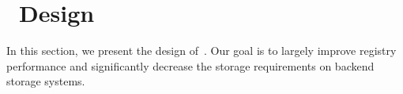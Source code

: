 \section{\sysname~Design}
\label{sec:slimmer}

%




In this section, we present the design of~\sysname. 
Our goal is to largely improve registry performance and significantly decrease the storage requirements on backend storage systems.







